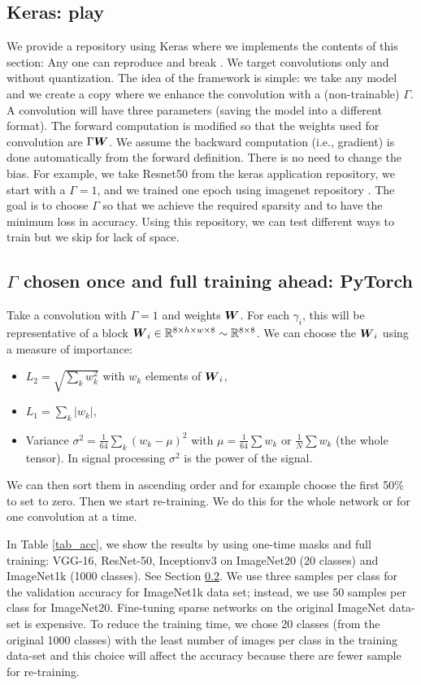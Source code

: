 \documentclass[sigconf]{acmart}
\begin{document}
\subsection{Keras: play}
We provide a repository using Keras \cite{chollet2015keras} where we
implements the contents of this section: Any one can reproduce and
break \cite{PaoloK2020}. We target convolutions only and without
quantization. The idea of the framework is simple: we take any model
and we create a copy where we enhance the convolution with a
(non-trainable) $\Gamma$. A convolution will have three parameters
(saving the model into a different format).  The forward computation
is modified so that the weights used for convolution are
$\Gamma{\boldsymbol W}$. We assume the backward computation (i.e., gradient) is
done automatically from the forward definition. There is no need to
change the bias. For example, we take Resnet50 from the keras
application repository, we start with a $\Gamma=1$, and we trained one
epoch using imagenet repository \cite{deng2009imagenet}.  The goal is
to choose $\Gamma$ so that we achieve the required sparsity and to
have the minimum loss in accuracy. Using this repository, we can test
different ways to train but we skip for lack of space.

\subsection{$\Gamma$ chosen once and full training ahead: PyTorch}
\label{sec:one-mask}
\label{sec:pytorch}
Take a convolution with $\Gamma = 1$ and weights ${\boldsymbol W}$. For each
$\gamma_i$, this will be representative of a block ${\boldsymbol W}_i \in \mathbb{R}^{8
  \times h \times w \times 8} \sim \mathbb{R}^{8\times 8}$. We can choose the
${\boldsymbol W}_i$ using a measure of importance:
\begin{itemize}
  \item $L_2 = \sqrt{\sum_k w_k^2}$ with $w_k$ elements of ${\boldsymbol W}_i$,
  \item $L_1 = \sum_k |w_k|$,
  \item Variance $\sigma^2 = \frac{1}{64}\sum_k (w_k -\mu)^2$ with
    $\mu = \frac{1}{64}\sum w_k $ or $\frac{1}{N}\sum w_k$ (the whole
    tensor). In signal processing $\sigma^2$ is the power of the
    signal.
\end{itemize}
We can then sort them in ascending order and for example choose the
first 50\% to set to zero. Then we start re-training. We do this for
the whole network or for one convolution at a time. 

In Table \ref{tab_acc}, we show the results by using one-time masks
and full training: VGG-16, ResNet-50, Inceptionv3 on ImageNet20 (20
classes) and ImageNet1k (1000 classes). See Section
\ref{sec:one-mask}. We use three samples per class for the validation
accuracy for ImageNet1k data set; instead, we use 50 samples per class
for ImageNet20. Fine-tuning sparse networks on the original ImageNet
data-set \cite{deng2009imagenet} is expensive. To reduce the training
time, we chose 20 classes (from the original 1000 classes) with the
least number of images per class in the training data-set and this
choice will affect the accuracy because there are fewer sample for
re-training.
\end{document}
